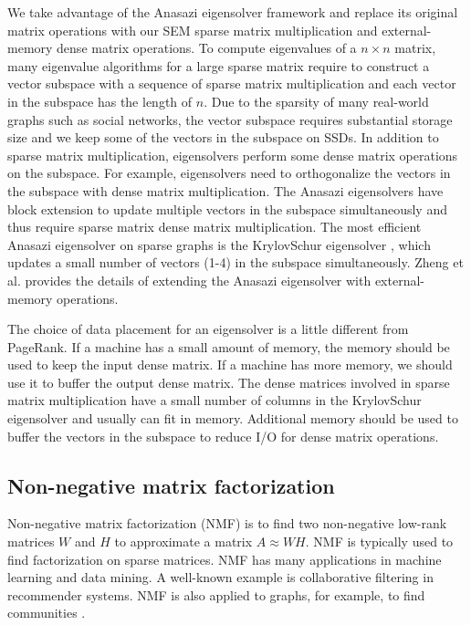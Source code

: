 We take advantage of the Anasazi eigensolver framework \cite{anasazi} and
replace its original matrix operations with our SEM sparse
matrix multiplication and external-memory dense matrix operations. To compute
eigenvalues of a $n \times n$ matrix, many eigenvalue algorithms for a large
sparse matrix require to construct a vector subspace with a sequence of
sparse matrix multiplication and each vector in the subspace has the length of $n$.
Due to the sparsity of many real-world graphs such as social networks,
the vector subspace requires substantial storage size and we keep
some of the vectors in the subspace on SSDs. In addition to sparse matrix
multiplication, eigensolvers perform some dense matrix operations on the subspace.
For example, eigensolvers need to orthogonalize the vectors in the subspace with
dense matrix multiplication. The Anasazi eigensolvers have block extension to
update multiple
vectors in the subspace simultaneously and thus require sparse matrix dense
matrix multiplication. The most efficient Anasazi eigensolver on sparse graphs
is the KrylovSchur eigensolver \cite{krylovschur}, which updates a small number
of vectors (1-4) in the subspace simultaneously. Zheng et al.
\cite{flasheigen} provides the details of extending the Anasazi eigensolver
with external-memory operations.

The choice of data placement for an eigensolver is a little different from
PageRank. If a machine has a small amount of memory, the memory should be
used to keep the input dense matrix. If a machine has more memory, we should
use it to buffer the output dense matrix. The dense matrices involved in
sparse matrix multiplication have a small number of columns in
the KrylovSchur eigensolver and usually can fit in memory. 
Additional memory should be used to buffer the vectors in the subspace
to reduce I/O for dense matrix operations.

\subsection{Non-negative matrix factorization}
Non-negative matrix factorization (NMF) \cite{nmf} is to find two non-negative
low-rank matrices $W$ and $H$ to approximate a matrix $A \approx WH$. NMF is
typically used to find factorization on sparse matrices. NMF has many applications
in machine learning
and data mining. A well-known example is collaborative filtering \cite{cf} in
recommender systems. NMF is also applied to graphs, for example, to find communities
\cite{yang13, wang11}.

